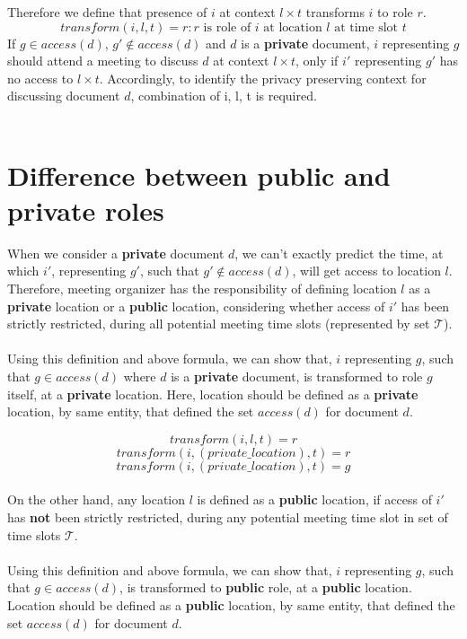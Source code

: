 \documentclass{article}
\begin{document}
Therefore we define that presence of $i$ at context $l \times t$ transforms $i$ to role $r$.
\[ transform(i, l, t) = r : r \text{ is role of } i \text{ at location } l \text{ at time slot } t \] 
\noindent
If $g \in access(d)$, $g' \notin access(d)$ and $d$ is a \textbf{private} document, $i$ representing $g$ should attend a meeting to discuss $d$ at context $l \times t$, only if $i'$ representing $g'$ has no access to $l \times t$. Accordingly, to identify the privacy preserving context for discussing document $d$, combination of i, l, t is required.\\ \\



\section{Difference between public and private roles}
When we consider a \textbf{private} document $d$, we can't exactly predict the time, at which $i'$, representing $g'$, such that $g' \notin access(d)$, will get access to location $l$. 
Therefore, meeting organizer has the responsibility of defining location $l$ as a \textbf{private} location or a \textbf{public} location, considering whether access of $i'$ has been strictly restricted, during all potential meeting time slots (represented by set $\mathcal{T}$).\\ \\
Using this definition and above formula, we can show that, $i$ representing $g$, such that $g \in access(d)$ where $d$ is a \textbf{private} document, is transformed to role $g$ itself, at a \textbf{private} location. 
Here, location should be defined as a \textbf{private} location, by same entity, that defined the set $access(d)$ for document $d$.

\[ transform(i, l, t) = r \]
\[ transform(i, (private\_location), t) = r \]
\[ transform(i, (private\_location), t) = g \] \\

\noindent
On the other hand, any location $l$ is defined as a \textbf{public} location, if access of $i'$ has \textbf{not} been strictly restricted, during any potential meeting time slot in set of time slots $\mathcal{T}$.\\ \\
Using this definition and above formula, we can show that, $i$ representing $g$, such that $g \in access(d)$, is transformed to \textbf{public} role, at a \textbf{public} location.
Location should be defined as a \textbf{public} location, by same entity, that defined the set $access(d)$ for document $d$.
\end{document}
